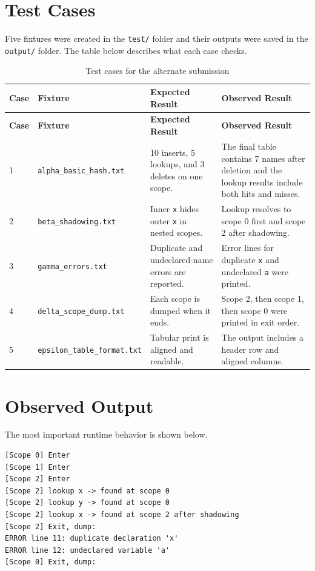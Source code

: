 \documentclass[11pt]{article}
\begin{document}
\section{Test Cases}
Five fixtures were created in the \texttt{test/} folder and their outputs were saved in the \texttt{output/} folder. The table below describes what each case checks.

\begin{longtable}{|p{}|p{}|p{}|p{}|}
\caption{Test cases for the alternate submission}\label{tab:altcases}\\
\hline
\textbf{Case} & \textbf{Fixture} & \textbf{Expected Result} & \textbf{Observed Result} \\
\hline
\endfirsthead
\hline
\textbf{Case} & \textbf{Fixture} & \textbf{Expected Result} & \textbf{Observed Result} \\
\hline
\endhead
1 & \texttt{alpha\_basic\_hash.txt} & 10 inserts, 5 lookups, and 3 deletes on one scope. & The final table contains 7 names after deletion and the lookup results include both hits and misses. \\
\hline
2 & \texttt{beta\_shadowing.txt} & Inner \texttt{x} hides outer \texttt{x} in nested scopes. & Lookup resolves to scope 0 first and scope 2 after shadowing. \\
\hline
3 & \texttt{gamma\_errors.txt} & Duplicate and undeclared-name errors are reported. & Error lines for duplicate \texttt{x} and undeclared \texttt{a} were printed. \\
\hline
4 & \texttt{delta\_scope\_dump.txt} & Each scope is dumped when it ends. & Scope 2, then scope 1, then scope 0 were printed in exit order. \\
\hline
5 & \texttt{epsilon\_table\_format.txt} & Tabular print is aligned and readable. & The output includes a header row and aligned columns. \\
\hline
\end{longtable}

\section{Observed Output}
The most important runtime behavior is shown below.

\begin{verbatim}
[Scope 0] Enter
[Scope 1] Enter
[Scope 2] Enter
[Scope 2] lookup x -> found at scope 0
[Scope 2] lookup y -> found at scope 0
[Scope 2] lookup x -> found at scope 2 after shadowing
[Scope 2] Exit, dump:
ERROR line 11: duplicate declaration 'x'
ERROR line 12: undeclared variable 'a'
[Scope 0] Exit, dump:
\end{verbatim}
\end{document}
